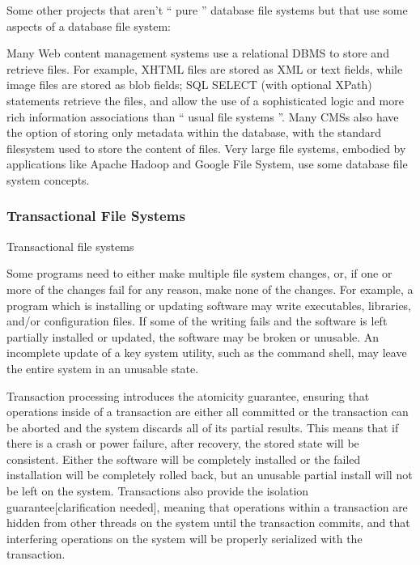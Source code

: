 Some other projects that aren't `` pure '' database file systems but that use
some aspects of a database file system:



	Many Web content management systems use a relational DBMS to store and
	retrieve files. For example, XHTML files are stored as XML or text fields,
	while image files are stored as blob fields; SQL SELECT (with optional
	XPath) statements retrieve the files, and allow the use of a sophisticated
	logic and more rich information associations than `` usual file systems ''.
	Many CMSs also have the option of storing only metadata within the database,
	with the standard filesystem used to store the content of files.  Very large
	file systems, embodied by applications like Apache Hadoop and Google File
	System, use some database file system concepts.

	

\subsubsectionend


\subsubsection{Transactional File Systems}
\label{sssec:transactional_file_systems}


Transactional file systems



Some programs need to either make multiple file system changes, or, if one or
more of the changes fail for any reason, make none of the changes. For example,
a program which is installing or updating software may write executables,
libraries, and/or configuration files. If some of the writing fails and the
software is left partially installed or updated, the software may be broken or
unusable. An incomplete update of a key system utility, such as the command
shell, may leave the entire system in an unusable state.



Transaction processing introduces the atomicity guarantee, ensuring that
operations inside of a transaction are either all committed or the transaction
can be aborted and the system discards all of its partial results. This means
that if there is a crash or power failure, after recovery, the stored state will
be consistent. Either the software will be completely installed or the failed
installation will be completely rolled back, but an unusable partial install
will not be left on the system. Transactions also provide the isolation
guarantee[clarification needed], meaning that operations within a transaction
are hidden from other threads on the system until the transaction commits, and
that interfering operations on the system will be properly serialized with the
transaction.



